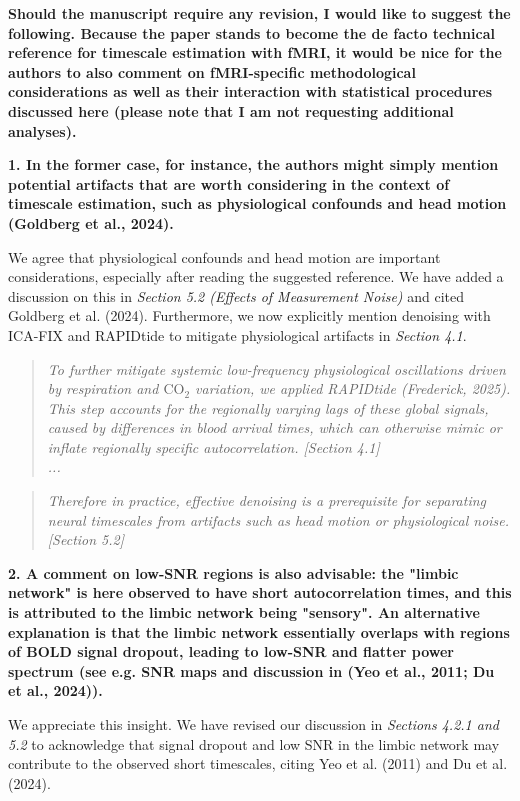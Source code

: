 \documentclass[docs/main.tex]{subfiles}
\newcommand{\reviewercomment}[1]{\vspace{0.3cm}\noindent\textbf{#1}\vspace{0.15cm}}
\newcommand{\manuscriptquote}[1]{\begin{quote}\textit{#1}\end{quote}}
\begin{document}
\reviewercomment{Should the manuscript require any revision, I would like to suggest the following. Because the paper stands to become the de facto technical reference for timescale estimation with fMRI, it would be nice for the authors to also comment on fMRI-specific methodological considerations as well as their interaction with statistical procedures discussed here (please note that I am not requesting additional analyses).}

\reviewercomment{1. In the former case, for instance, the authors might simply mention potential artifacts that are worth considering in the context of timescale estimation, such as physiological confounds and head motion (Goldberg et al., 2024).}

We agree that physiological confounds and head motion are important considerations, especially after reading the suggested reference. We have added a discussion on this in \textit{Section 5.2 (Effects of Measurement Noise)} and cited Goldberg et al. (2024). Furthermore, we now explicitly mention denoising with ICA-FIX and RAPIDtide to mitigate physiological artifacts in \textit{Section 4.1}.

\manuscriptquote{To further mitigate systemic low-frequency physiological oscillations driven by respiration and $\text{CO}_2$ variation, we applied RAPIDtide (Frederick, 2025). This step accounts for the regionally varying lags of these global signals, caused by differences in blood arrival times, which can otherwise mimic or inflate regionally specific autocorrelation. [Section 4.1]\\...}


\manuscriptquote{Therefore in practice, effective denoising is a prerequisite for separating neural timescales from artifacts such as head motion or physiological noise. [Section 5.2]}

\reviewercomment{2. A comment on low-SNR regions is also advisable: the "limbic network" is here observed to have short autocorrelation times, and this is attributed to the limbic network being "sensory". An alternative explanation is that the limbic network essentially overlaps with regions of BOLD signal dropout, leading to low-SNR and flatter power spectrum (see e.g. SNR maps and discussion in (Yeo et al., 2011; Du et al., 2024)).}

We appreciate this insight. We have revised our discussion in \textit{Sections 4.2.1 and 5.2} to acknowledge that signal dropout and low SNR in the limbic network may contribute to the observed short timescales, citing Yeo et al. (2011) and Du et al. (2024).
\end{document}
